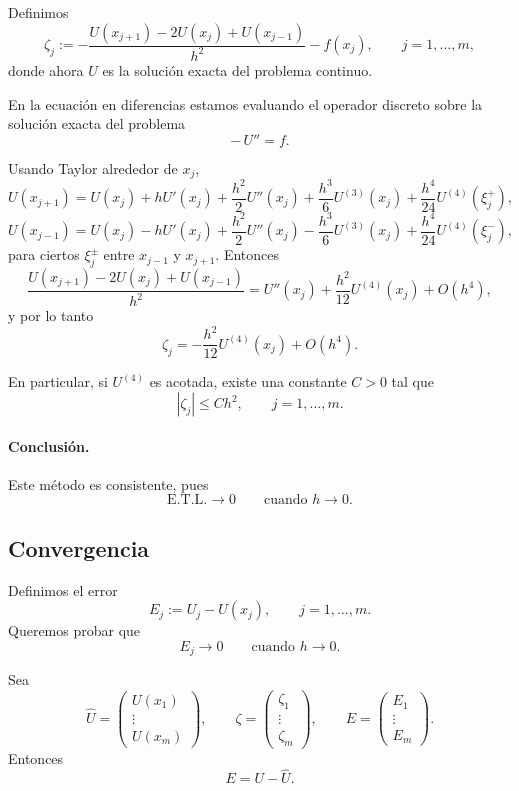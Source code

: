 Definimos
\[
\zeta_j
:=
-\frac{U(x_{j+1})-2U(x_j)+U(x_{j-1})}{h^2}
-f(x_j),
\qquad j=1,\dots,m,
\]
donde ahora \(U\) es la solución exacta del problema continuo.

\begin{observacion}
En la ecuación en diferencias estamos evaluando el operador discreto sobre la solución exacta del problema
\[
-\,U''=f.
\]
\end{observacion}

Usando Taylor alrededor de \(x_j\),
\[
U(x_{j+1})
=
U(x_j)+hU'(x_j)+\frac{h^2}{2}U''(x_j)+\frac{h^3}{6}U^{(3)}(x_j)+\frac{h^4}{24}U^{(4)}(\xi_j^+),
\]
\[
U(x_{j-1})
=
U(x_j)-hU'(x_j)+\frac{h^2}{2}U''(x_j)-\frac{h^3}{6}U^{(3)}(x_j)+\frac{h^4}{24}U^{(4)}(\xi_j^-),
\]
para ciertos \(\xi_j^\pm\) entre \(x_{j-1}\) y \(x_{j+1}\). Entonces
\[
\frac{U(x_{j+1})-2U(x_j)+U(x_{j-1})}{h^2}
=
U''(x_j)+\frac{h^2}{12}U^{(4)}(x_j)+O(h^4),
\]
y por lo tanto
\[
\zeta_j
=
-\frac{h^2}{12}U^{(4)}(x_j)+O(h^4).
\]

En particular, si \(U^{(4)}\) es acotada, existe una constante \(C>0\) tal que
\[
|\zeta_j|\le Ch^2,
\qquad j=1,\dots,m.
\]

\paragraph{Conclusión.}
Este método es consistente, pues
\[
\text{E.T.L.}\longrightarrow 0
\qquad \text{cuando } h\to 0.
\]

\subsection{Convergencia}

Definimos el error
\[
E_j:=U_j-U(x_j),
\qquad j=1,\dots,m.
\]
Queremos probar que
\[
E_j\longrightarrow 0
\qquad \text{cuando } h\to 0.
\]

Sea
\[
\widehat U=
\begin{pmatrix}
U(x_1)\\
\vdots\\
U(x_m)
\end{pmatrix},
\qquad
\zeta=
\begin{pmatrix}
\zeta_1\\
\vdots\\
\zeta_m
\end{pmatrix},
\qquad
E=
\begin{pmatrix}
E_1\\
\vdots\\
E_m
\end{pmatrix}.
\]
Entonces
\[
E=U-\widehat U.
\]

